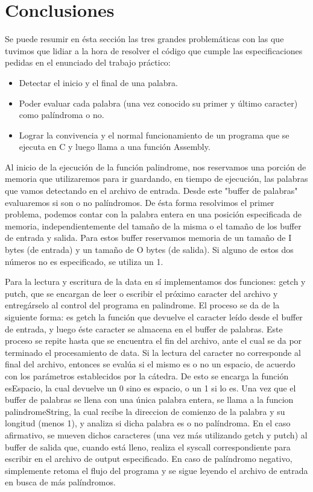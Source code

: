 \documentclass[a4paper,10pt]{article}
\begin{document}
\section{Conclusiones}






Se puede resumir en ésta sección las tres grandes problemáticas con las que tuvimos que lidiar a la hora de resolver el código que cumple las especificaciones pedidas en el enunciado del trabajo práctico:

\begin{itemize}
\item Detectar el inicio y el final de una palabra.

\item Poder evaluar cada palabra (una vez conocido su primer y último caracter) como palíndroma o no.

\item Lograr la convivencia y el normal funcionamiento de un programa que se ejecuta en C y luego llama a una función Assembly.
\end{itemize}

	Al inicio de la ejecución de la función palindrome, nos reservamos una porción de memoria que utilizaremos para ir guardando, en tiempo de ejecución, las palabras que vamos detectando en el archivo de entrada. Desde este "buffer de palabras" evaluaremos si son o no palíndromos. De ésta forma resolvimos el primer problema, podemos contar con la palabra entera en una posición especificada de memoria, independientemente del tamaño de la misma o el tamaño de los buffer de entrada y salida. Para estos buffer reservamos memoria de un tamaño de I bytes (de entrada) y un tamaño de O bytes (de salida). Si alguno de estos dos números no es especificado, se utiliza un 1.
	
	Para la lectura y escritura de la data en sí implementamos dos funciones: getch y putch, que se encargan de leer o escribir el próximo caracter del archivo y entregárselo al control del programa en
palindrome. El proceso se da de la siguiente forma: es getch la función que devuelve el caracter leído desde el buffer de entrada, y luego éste caracter se almacena en el buffer de palabras. Este proceso se repite hasta que se encuentra el fin del archivo, ante el cual se da por terminado el
procesamiento de data. Si la lectura del caracter no corresponde al final del archivo, entonces se evalúa si el mismo es o no un espacio, de acuerdo con los parámetros establecidos por la cátedra. De esto se encarga la función esEspacio, la cual devuelve un 0 sino es espacio, o un 1 si lo es. Una vez que el buffer de palabras se llena con una única palabra entera, se llama a la funcion palindromeString, la cual recibe la direccion de comienzo de la palabra y su longitud (menos 1), y analiza si dicha palabra es o no palíndroma. En el caso afirmativo, se mueven dichos caracteres (una vez más utilizando getch y putch) al buffer de salida que, cuando está lleno, realiza el syscall correspondiente para escribir en el archivo de output especificado. En caso de palíndromo negativo, simplemente retoma el flujo del programa y se sigue leyendo el archivo de entrada en busca de más palíndromos.
\end{document}
